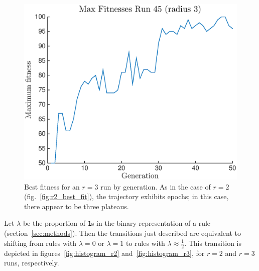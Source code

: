 \begin{figure} 
\begin{center}
\includegraphics[width=\linewidth]{figures/max_epoch_radius3.eps}
\caption{Best fitness for an $r = 3$ run by generation. As in the case of $r = 2$ (fig.~\ref{fig:r2_best_fit}), the trajectory exhibits epochs; in this case, there appear to be three plateaus.}
\label{fig:r3_best_fit}
\end{center}
\end{figure}

Let $\lambda$ be the proportion of \texttt{1}s in the binary representation of a rule (section~\ref{sec:methods}). Then the transitions just described are 
equivalent to shifting from rules with $\lambda = 0$ or $\lambda = 1$ to rules with $\lambda \approx \frac{1}{2}$. This transition is depicted in 
figures~\ref{fig:histogram_r2} and~\ref{fig:histogram_r3}, for $r = 2$ and $r = 3$ runs, respectively.

